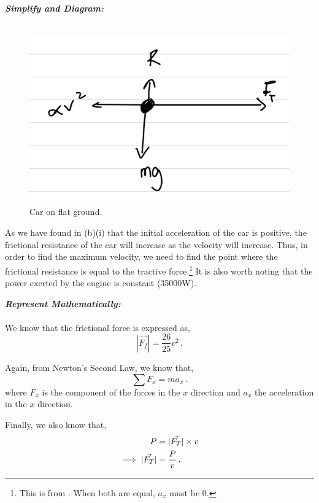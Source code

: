 \begin{subquestions}
\begin{subsubquestions}
\textbf{\textit{Simplify and Diagram:}} \\ \\
\begin{figure}[H]
	\begin{center}
		\includegraphics[scale=0.25]{../2009/figures/2009q5-2}
		\caption{\label{2009:q5:Diagram3} Car on flat ground.}
	\end{center}
\end{figure}	
As we have found in (b)(i) that the initial acceleration of the car is positive, the frictional resistance of the car will increase as the velocity will increase. Thus, in order to find the maximum velocity, we need to find the point where the frictional resistance is equal to the tractive force.\footnote{This is from . When both are equal, $a_x$ must be 0.} It is also worth noting that the power exerted by the engine is constant (35000W).




\textbf{\textit{Represent Mathematically:}} \\ \\
We know that the frictional force is expressed as,
\begin{equation}
	|\vec{F_f}| = \frac{26}{25}v^2 \,.
\end{equation}

Again, from Newton's Second Law, we know that,
\begin{equation}
	\sum F_x = ma_x \label{2009:q5:FxEqn3} \,.
\end{equation}
where $F_x$ is the component of the forces in the $x$ direction and $a_x$ the acceleration in the $x$ direction.

Finally, we also know that, 
\begin{align}
	P & = |\vec{F_T}|\times v \label{2009:q5:PEqn2} \nonumber \\
	\implies |\vec{F_T}| & = \frac{P}{v} \,. 
\end{align}
	




\end{subsubquestions}
\end{subquestions}
